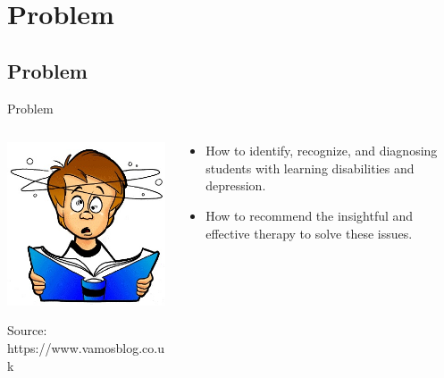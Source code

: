 \documentclass{beamer}
\begin{document}
\section{Problem}

\subsection{Problem}
\begin{frame}{Problem}
\begin{columns}
	\begin{column}{0.5\textwidth}  %
		\begin{center}
			\includegraphics[width=1\textwidth]{Learn.jpg}
		\end{center}
		{\tiny 	Source: https://www.vamosblog.co.uk}
	\end{column}
	\begin{column}{0.5\textwidth}
		\begin{itemize}
			\item How to identify, recognize, and diagnosing students with learning disabilities and depression.
			\item How to recommend the insightful and effective therapy to solve these issues.
			
		\end{itemize}
		
	\end{column}
	
\end{columns}

\end{frame}
\end{document}
